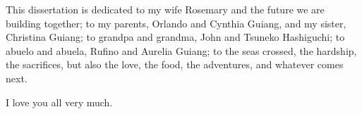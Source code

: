 \begin{dedication}
\setsinglespacing
\parindent0pt\parskip\baselineskip
\begin{center}
This dissertation is dedicated to my wife Rosemary and the future we are building together; 
to my parents, Orlando and Cynthia Guiang, and my sister, Christina Guiang; 
to grandpa and grandma, John and Tsuneko Hashiguchi; 
to abuelo and abuela, Rufino and Aurelia Guiang; 
to the seas crossed, the hardship, the sacrifices, but also the love, the food, the adventures, and whatever comes next. 


I love you all very much. 
\end{center}
\end{dedication}
